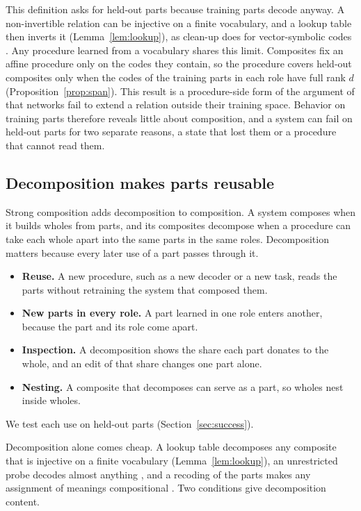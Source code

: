 \documentclass[10pt]{article}
\theoremstyle{plain}
\theoremstyle{remark}
\begin{document}
This definition asks for held-out parts because training parts decode anyway. A non-invertible relation can be injective on a finite vocabulary, and a lookup table then inverts it (Lemma~\ref{lem:lookup}), as clean-up does for vector-symbolic codes \citep{plate1995}. Any procedure learned from a vocabulary shares this limit. Composites fix an affine procedure only on the codes they contain, so the procedure covers held-out composites only when the codes of the training parts in each role have full rank $d$ (Proposition~\ref{prop:span}). This result is a procedure-side form of the argument of \citet{marcus1998} that networks fail to extend a relation outside their training space. Behavior on training parts therefore reveals little about composition, and a system can fail on held-out parts for two separate reasons, a state that lost them or a procedure that cannot read them.

\subsection{Decomposition makes parts reusable}
\label{sec:decomposition}

Strong composition adds decomposition to composition. A system composes when it builds wholes from parts, and its composites decompose when a procedure can take each whole apart into the same parts in the same roles. Decomposition matters because every later use of a part passes through it.
\begin{itemize}
  \item \textbf{Reuse.} A new procedure, such as a new decoder or a new task, reads the parts without retraining the system that composed them.
  \item \textbf{New parts in every role.} A part learned in one role enters another, because the part and its role come apart.
  \item \textbf{Inspection.} A decomposition shows the share each part donates to the whole, and an edit of that share changes one part alone.
  \item \textbf{Nesting.} A composite that decomposes can serve as a part, so wholes nest inside wholes.
\end{itemize}
We test each use on held-out parts (Section~\ref{sec:success}).

Decomposition alone comes cheap. A lookup table decomposes any composite that is injective on a finite vocabulary (Lemma~\ref{lem:lookup}), an unrestricted probe decodes almost anything \citep{hewitt2019}, and a recoding of the parts makes any assignment of meanings compositional \citep{zadrozny1994}. Two conditions give decomposition content.
\end{document}
